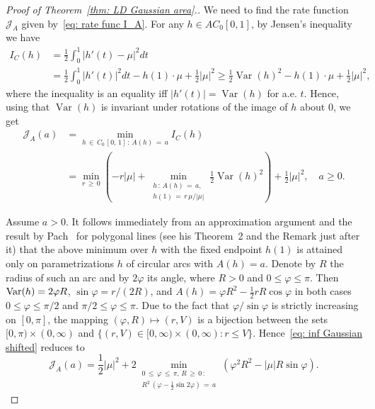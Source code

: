 \documentclass[10pt]{amsart}
\theoremstyle{definition}\newtheorem{defi}[theo]{Definition}\newtheorem{rema}[theo]{Remark}\newtheorem{exam}[theo]{Example}\newtheorem{exem}[theo]{Example}\newtheorem{nota}[theo]{Notation}
\newcommand{\Jcl}{\mathcal{J}}
\newcommand{\Var}{\mathop{\mathrm{Var}}\nolimits}
\begin{document}
\begin{proof}[Proof of Theorem~\ref{thm: LD Gaussian area}.]
We need to find the rate function $\Jcl_A$ given by~\eqref{eq: rate func I_A}. For any $h \in AC_0[0,1]$, by Jensen's inequality we have
\begin{align*}
I_C(h)& = \frac12 \int_0^1 \left|h'(t)-\mu\right|^2 dt \\
&= \frac12 \int_0^1\left|h'(t)\right|^2 dt - h(1) \cdot \mu + \frac12 |\mu|^2 
\ge \frac12 \Var(h)^2 - h(1) \cdot \mu + \frac12 |\mu|^2,
\end{align*}
where the inequality is an equality iff $|h'(t)|=\Var(h)$ for a.e. $t$. Hence, using that $\Var(h)$ is invariant under rotations of the image of $h$ about $0$, we get
\begin{equation}\label{eq: inf Gaussian shifted}
\begin{aligned}
\Jcl_A(a) &= \min_{h\,\in\,C_0\,[0,\,1]\,:\,A(h)\,=\,a} I_C(h) \\
&= \min_{r\,\ge\,0} \left(- r |\mu| + \min_{\substack{h\,:\,A(h)\,=\,a,\\
h(1)\,=\,r\,\mu / |\mu|}} \frac12 \Var(h)^2 \right) + \frac12 |\mu|^2, \quad a \ge 0.
\end{aligned}
\end{equation}

Assume $a>0$. It follows immediately from an approximation argument and the result by Pach~\cite{pach1978isoperimetric} for polygonal lines (see his Theorem~2 and the Remark just after it) that the above minimum over $h$ with the fixed endpoint $h(1)$ is attained only on parametrizations $h$ of circular arcs with $A(h)=a$. Denote by $R$ the radius of such an arc and by $2 \varphi$ its angle, where $R>0$ and $0 \le \varphi \le \pi$. Then $\Var(h)\linebreak= 2 \varphi R$, $\sin \varphi = r/(2 R)$, and $A(h)= \varphi R^2 - \frac12 r R \cos \varphi$ in both cases $0 \le \varphi \le \pi/2$ and $\pi/2 \le \varphi \le \pi$. Due to the fact that $\varphi / \sin \varphi$ is strictly increasing on $[0, \pi]$, the mapping $(\varphi, R) \mapsto (r, V)$ is a bijection between the sets $[0, \pi) \times (0,\infty)$ and $\{(r, V) \in [0, \infty) \times (0, \infty): r \le V \}$. Hence~\eqref{eq: inf Gaussian shifted} reduces to
\begin{equation}\label{eq: minimization}
\Jcl_A(a) =\frac12 |\mu|^2 + 2 \min_{\substack{0\,\le\,\varphi \,\le\,\pi,\,R\,\ge\,0\,: \\ R^2\,\left(\varphi - \frac12 \sin 2 \varphi\right)\,=\,a}} \left(\varphi^2 R^2 - |\mu| R \sin \varphi \right).
\end{equation}


\end{proof}
\end{document}
